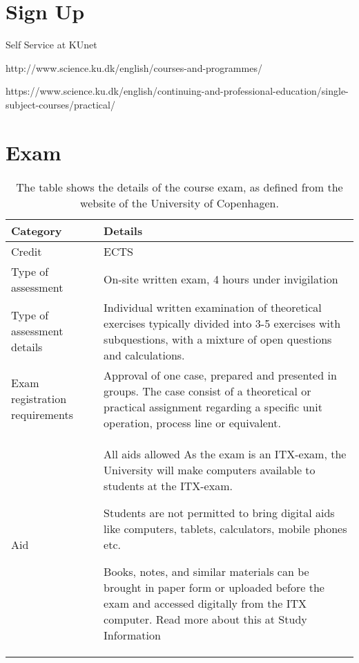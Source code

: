 \section{Sign Up}
Self Service at KUnet

http://www.science.ku.dk/english/courses-and-programmes/

https://www.science.ku.dk/english/continuing-and-professional-education/single-subject-courses/practical/

\section{Exam}
\newpage
\begin{table}[t]
    \centering
    \caption{The table shows the details of the course exam, as defined from the website of the University of Copenhagen.}
    \label{tab:course_details}
    \begin{tabular}{ l | >{\raggedright\arraybackslash}p{\textwidth - 5.8cm} }
        \textbf{Category} & \textbf{Details} \\ 
        \hline
        Credit & 7.5 ECTS \\ 

        Type of assessment & On-site written exam, 4 hours under invigilation \\ 

        Type of assessment details & Individual written examination of theoretical exercises typically divided into 3-5 exercises with subquestions, with a mixture of open questions and calculations. \\ 

        Exam registration requirements & Approval of one case, prepared and presented in groups. The case consist of a theoretical or practical assignment regarding a specific unit operation, process line or equivalent. \\ 

        Aid & All aids allowed
        As the exam is an ITX-exam, the University will make computers available to students at the ITX-exam.
        
        Students are not permitted to bring digital aids like computers, tablets, calculators, mobile phones etc.
        
        Books, notes, and similar materials can be brought in paper form or uploaded before the exam and accessed digitally from the ITX computer. Read more about this at Study Information \\ 


\end{tabular}
\end{table}

